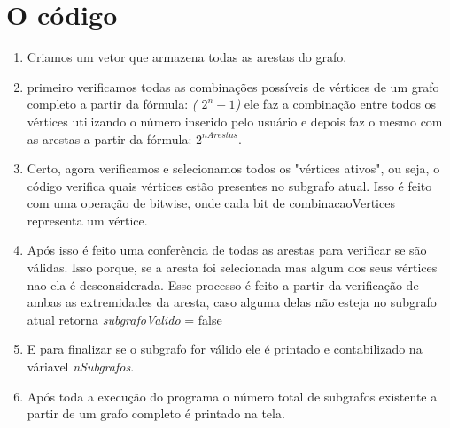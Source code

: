 \documentclass[12pt]{article}
\begin{document}
\section{O código}
\begin{enumerate}
    \item Criamos um vetor que armazena todas as arestas do grafo. 
    \item  primeiro verificamos todas as combinações possíveis de vértices de um grafo completo a partir da fórmula: \textit{( \( 2^n - 1 \))}
ele faz a combinação entre todos os vértices utilizando o número inserido pelo usuário e depois faz o mesmo com as arestas a partir da fórmula: \( 2^{nArestas} \). 

    \item Certo, agora verificamos e selecionamos todos os "vértices ativos", ou seja, o código verifica quais vértices estão presentes no subgrafo atual. Isso é feito com uma operação de bitwise, onde cada bit de combinacaoVertices representa um vértice.
    \item Após isso é feito uma conferência de todas as arestas para verificar se são válidas. Isso porque, se a aresta foi selecionada mas algum dos seus vértices nao ela é desconsiderada. Esse processo é feito a partir da verificação de ambas as extremidades da aresta, caso alguma delas não esteja no subgrafo atual retorna \textit{subgrafoValido} = false
    \item E para finalizar se o subgrafo for válido ele é printado e contabilizado na váriavel \textit{nSubgrafos}.
    \item Após toda a execução do programa o número total de subgrafos existente a partir de um grafo completo é printado na tela.
\end{enumerate}
\end{document}
